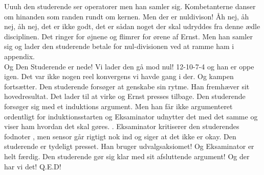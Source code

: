 \documentclass[a4paper,11pt]{article}
\begin{document}
\begin{sketch}
Uuuh den studerende ser operatorer  men han samler sig. 
Kombetanterne danser om hinanden som randen rundt om kernen. Men der er nuldivison!   Åh nej, åh nej, åh nej, det er ikke godt, det er sådan noget der skal udryddes fra denne ædle disciplinen. Det ringer for øjnene og flimrer for ørene af Ernst. Men han samler sig og lader den studerende betale for nul-divisionen ved at ramme ham i appendix.  \\
Og Den Studerende er nede! Vi lader den gå mod nul! 12-10-7-4 og han er oppe igen. Det var ikke nogen reel konvergens vi havde gang i der.  Og kampen fortsætter. Den studerende forsøger at genskabe sin rytme. Han fremhæver sit hovedresultat. \act{} Det lader til at virke og Ernst presses tilbage. Den studerende forsøger sig med et induktions argument. Men han får ikke argumenteret ordentligt for induktionsstarten  og Eksaminator udnytter det med det samme og viser ham hvordan det skal gøres. . Eksaminator kritiserer den studerendes fodnoter , men sensor går rigtigt nok ind og siger at det ikke er okay. 
Den studerende er tydeligt presset. Han bruger udvalgsaksiomet!  Og Eksaminator er helt færdig. Den studerende gør sig klar med sit afsluttende argument! Og der har vi det! Q.E.D!  

\end{sketch}
\end{document}
